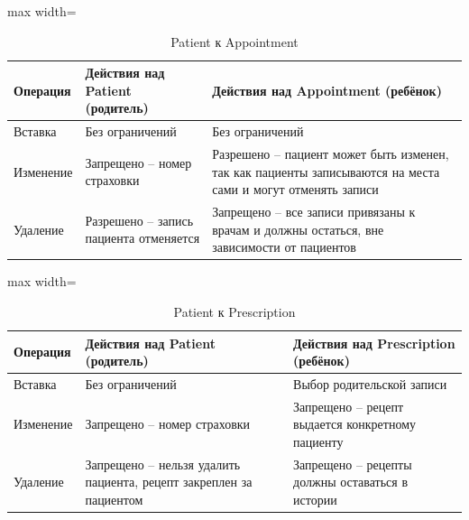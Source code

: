 \documentclass[a4paper, 14pt]{extarticle}
\begin{document}
\begin{table}[h!]
\centering
\captionsetup{singlelinecheck=false, position=top}
\caption{Patient к Appointment}
\begin{adjustbox}{max width=\textwidth}
\begin{tabular}{|p{}|p{}|p{}|}
\hline
	\textbf{Операция} & \textbf{Действия над Patient (родитель)} & \textbf{Действия над Appointment (ребёнок)} \\
\hline
Вставка & Без ограничений & Без ограничений \\
\hline
Изменение & Запрещено -- номер страховки & Разрешено -- пациент может быть изменен, так как пациенты записываются на места сами и могут отменять записи \\
\hline
Удаление & Разрешено -- запись пациента отменяется & Запрещено -- все записи привязаны к врачам и должны остаться, вне зависимости от пациентов \\
\hline
\end{tabular}
\end{adjustbox}
\label{table:PatientAppointment}
\end{table}

\begin{table}[h!]
\centering
\captionsetup{singlelinecheck=false, position=top}
\caption{Patient к Prescription}
\begin{adjustbox}{max width=\textwidth}
\begin{tabular}{|p{}|p{}|p{}|}
\hline
	\textbf{Операция} & \textbf{Действия над Patient (родитель)} & \textbf{Действия над Prescription (ребёнок)} \\
\hline
Вставка & Без ограничений & Выбор родительской записи \\
\hline
Изменение & Запрещено -- номер страховки & Запрещено -- рецепт выдается конкретному пациенту \\
\hline
Удаление & Запрещено -- нельзя удалить пациента, рецепт закреплен за пациентом & Запрещено -- рецепты должны оставаться в истории \\
\hline
\end{tabular}
\end{adjustbox}
\label{table:PatientPrescription}
\end{table}
\end{document}
